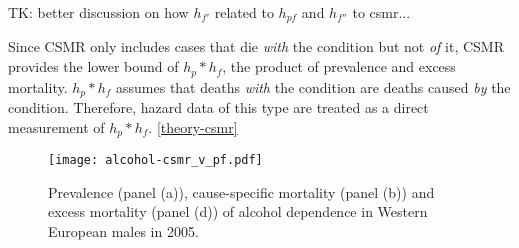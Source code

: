 TK: better discussion on how $h_{f'}$ related to $h_{pf}$ and $h_{f''}$ to csmr...

Since CSMR only includes cases that die \emph{with} the condition but not \emph{of} it, CSMR provides the lower bound of $h_{p}*h_{f}$, the product of prevalence and excess mortality.  $h_{p}*h_{f}$ assumes that deaths \emph{with} the condition are deaths caused \emph{by} the condition.  Therefore, hazard data of this type are treated as a direct measurement of $h_{p}*h_{f}$.
\ref{theory-csmr}


    \begin{figure}[h]
        \begin{center}
            \texttt{[image: alcohol-csmr\_v\_pf.pdf]}
            \caption{Prevalence (panel (a)), cause-specific mortality (panel (b)) and excess mortality (panel (d)) of alcohol dependence in Western European males in 2005.}
            \label{fig:app-alcohol compare}
        \end{center}
    \end{figure} 